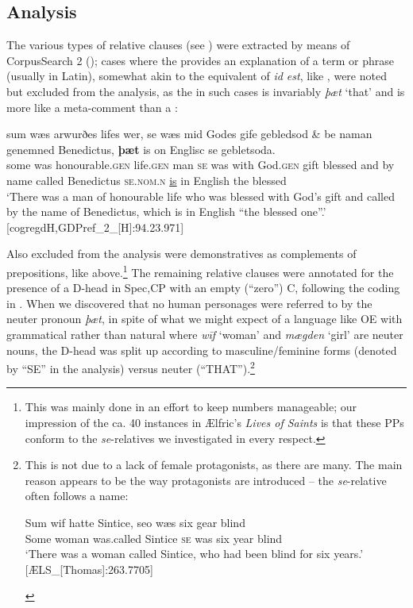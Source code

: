 \documentclass[output=paper,colorlinks,citecolor=brown]{langscibook}
\begin{document}
\subsection{Analysis}\label{sec:los:4.2}
The various types of relative clauses (see ) were extracted by means of CorpusSearch 2 (\citealt{Randall2005}); cases where the  provides an explanation of a term or phrase (usually in Latin), somewhat akin to the equivalent of \textit{id est}, like , were noted but excluded from the analysis, as the  in such cases is invariably \textit{þæt} ‘that' and is more like a meta-comment than a :

 \ea\label{ex:los:20}
 \gll sum wæs arwurðes lifes wer, se wæs mid Godes gife gebledsod \& be naman genemned Benedictus, \textbf{þæt} is on Englisc se gebletsoda. \\
some was honourable.\textsc{gen} \textup{life.}\textsc{gen} \textup{man} \textsc{se} was with God.\textsc{gen} gift blessed and by name called Benedictus \textsc{se.nom.n} \underline{is} in English the blessed \\
\glt ‘There was a man of honourable life who was blessed with God's gift and called by the name of Benedictus, which is in English “the blessed one”.' \\ \hfill [cogregdH,GDPref\_2\_[H]:94.23.971]
\z 

Also excluded from the analysis were demonstratives as complements of \linebreak[4]prepositions, like  above.\footnote{This was mainly done in an effort to keep numbers manageable; our impression of the ca. 40 instances in \textsf{Æ}lfric's \textit{Lives of Saints} is that these PPs conform to the \textit{se}{}-relatives we investigated in every respect.} The remaining relative clauses were annotated for the presence of a D-head in Spec,CP with an empty (“zero”) C, following the coding in . When we discovered that no human personages were referred to by the neuter pronoun \textit{þæt}, in spite of what we might expect of a language like OE with grammatical rather than natural  where \textit{wīf} ‘woman' and \textit{mægden} ‘girl' are neuter nouns, the D-head was split up according to masculine/feminine forms (denoted by “SE” in the analysis) versus neuter (“THAT”).\footnote{This is not due to a lack of female protagonists, as there are many. The main reason appears to be the way protagonists are introduced – the \textit{se}{}-relative often follows a name:

\ea \label{ex:los:i}
 \gll Sum wif hatte Sintice, seo wæs six gear blind\\
Some woman was.called Sintice \textsc{se} was six year blind \\
\glt ‘There was a woman called Sintice, who had been blind for six years.'\\ \hfill [ÆLS\_[Thomas]:263.7705]
\z

\label{footnote_5}
}
\end{document}

